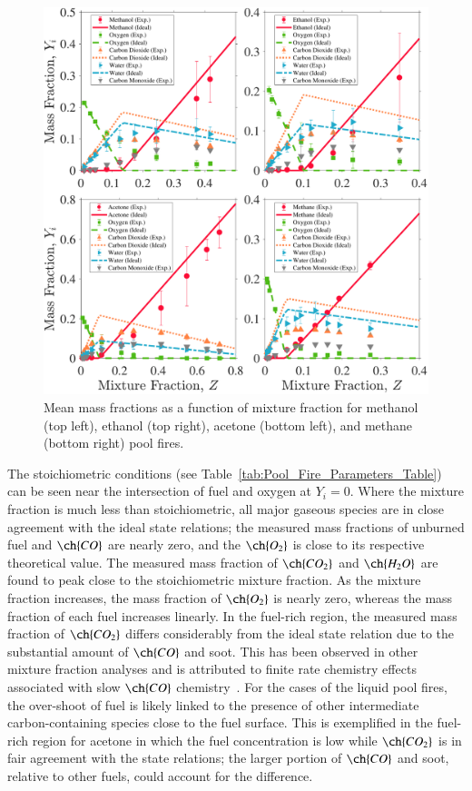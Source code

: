 \documentclass[preprint,review,12pt]{elsarticle}
\begin{document}
\begin{figure}[!t]
	\centering
\includegraphics[width=14.2cm,keepaspectratio]{Combined_Mass_Frac_Mix_Frac.pdf}
	\caption[Mean mass fractions as a function of mixture fraction]{Mean mass fractions as a function of mixture fraction for methanol (top left), ethanol (top right), acetone (bottom left), and methane (bottom right) pool fires.}
	\label{fig:Mixture_Fraction}
\end{figure}

The stoichiometric conditions (see Table~\ref{tab:Pool_Fire_Parameters_Table}) can be seen near the intersection of fuel and oxygen at $Y_i=0$. Where the mixture fraction is much less than stoichiometric, all major gaseous species are in close agreement with the ideal state relations; the measured mass fractions of unburned fuel and $\ch{CO}$ are nearly zero, and the $\ch{O_2}$ is close to its respective theoretical value. The measured mass fraction of $\ch{CO_{2}}$ and $\ch{H_{2}O}$ are found to peak close to the stoichiometric mixture fraction. As the mixture fraction increases, the mass fraction of $\ch{O_2}$ is nearly zero, whereas the mass fraction of each fuel increases linearly. In the fuel-rich region, the measured mass fraction of $\ch{CO_{2}}$ differs considerably from the ideal state relation due to the substantial amount of $\ch{CO}$ and soot. This has been observed in other mixture fraction analyses and is attributed to finite rate chemistry effects associated with slow $\ch{CO}$ chemistry~\cite{Sivathanu1990}. For the cases of the liquid pool fires, the over-shoot of fuel is likely linked to the presence of other intermediate carbon-containing species close to the fuel surface. This is exemplified in the fuel-rich region for acetone in which the fuel concentration is low while $\ch{CO_{2}}$ is in fair agreement with the state relations; the larger portion of $\ch{CO}$ and soot, relative to other fuels, could account for the difference.
\end{document}
